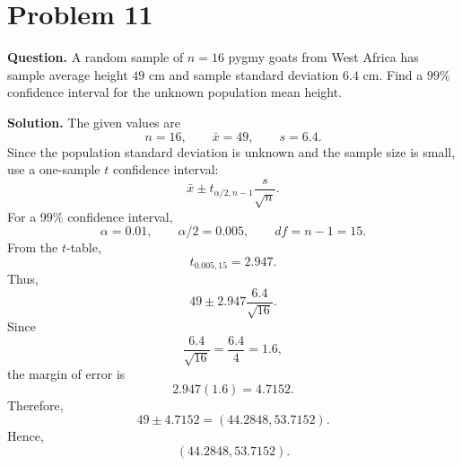 \documentclass[11pt]{article}
\begin{document}
\section*{Problem 11}

\textbf{Question.} A random sample of $n=16$ pygmy goats from West Africa has sample average height $49$ cm and sample standard deviation $6.4$ cm. Find a $99\%$ confidence interval for the unknown population mean height.

\textbf{Solution.} The given values are
\[
n=16, \qquad \bar x=49, \qquad s=6.4.
\]
Since the population standard deviation is unknown and the sample size is small, use a one-sample $t$ confidence interval:
\[
\bar x\pm t_{\alpha/2,n-1}\frac{s}{\sqrt n}.
\]
For a $99\%$ confidence interval,
\[
\alpha=0.01, \qquad \alpha/2=0.005, \qquad df=n-1=15.
\]
From the $t$-table,
\[
t_{0.005,15}=2.947.
\]
Thus,
\[
49\pm 2.947\frac{6.4}{\sqrt{16}}.
\]
Since
\[
\frac{6.4}{\sqrt{16}}=\frac{6.4}{4}=1.6,
\]
the margin of error is
\[
2.947(1.6)=4.7152.
\]
Therefore,
\[
49\pm 4.7152=(44.2848,53.7152).
\]
Hence,
\[
\boxed{(44.2848,53.7152)}.
\]

\newpage
\end{document}
